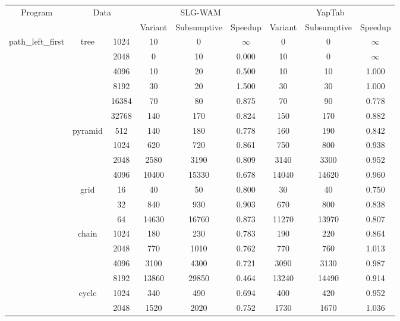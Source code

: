 \begin{table}[ht]
\scriptsize{
\begin{tabular}{c|c|c|c|c|c|c|c|c}
   \hline
   \multirow{2}{*}{Program} & \multicolumn{2}{c|}{\multirow{2}{*}{Data}} & \multicolumn{3}{c|}{SLG-WAM} & \multicolumn{3}{c}{YapTab} \\ \cline{4-6} \cline{7-9}
   & \multicolumn{2}{c|}{} & Variant & Subsumptive & Speedup & Variant & Subsumptive & Speedup \\ \hline
   
   \multirow{20}{*}{path\_left\_first} &  \multirow{6}{*}{tree} &  1024 &  10 & 0 &  $\infty$  & 0 & 0 &  $\infty$ \\
   &  &  2048 &  0 & 10 &  0.000  & 10 & 0 &  $\infty$ \\
   &  &  4096 &  10 & 20 &  0.500  & 10 & 10 &  1.000 \\
   &  &  8192 &  30 & 20 &  1.500  & 30 & 30 &  1.000 \\
   &  &  16384 &  70 & 80 &  0.875  & 70 & 90 &  0.778 \\
   &  &  32768 &  140 & 170 &  0.824  & 150 & 170 &  0.882 \\
   \cline{2-9}
   &  \multirow{4}{*}{pyramid} &  512 &  140 & 180 &  0.778  & 160 & 190 &  0.842 \\
   &  &  1024 &  620 & 720 &  0.861  & 750 & 800 &  0.938 \\
   &  &  2048 &  2580 & 3190 &  0.809  & 3140 & 3300 &  0.952 \\
   &  &  4096 &  10400 & 15330 &  0.678  & 14040 & 14620 &  0.960 \\
   \cline{2-9}
   &  \multirow{3}{*}{grid} &  16 &  40 & 50 &  0.800  & 30 & 40 &  0.750 \\
   &  &  32 &  840 & 930 &  0.903  & 670 & 800 &  0.838 \\
   &  &  64 &  14630 & 16760 &  0.873  & 11270 & 13970 &  0.807 \\
   \cline{2-9}
   &  \multirow{4}{*}{chain} &  1024 &  180 & 230 &  0.783  & 190 & 220 &  0.864 \\
   &  &  2048 &  770 & 1010 &  0.762  & 770 & 760 &  1.013 \\
   &  &  4096 &  3100 & 4300 &  0.721  & 3090 & 3130 &  0.987 \\
   &  &  8192 &  13860 & 29850 &  0.464  & 13240 & 14490 &  0.914 \\
   \cline{2-9}
   &  \multirow{3}{*}{cycle} &  1024 &  340 & 490 &  0.694  & 400 & 420 &  0.952 \\
   &  &  2048 &  1520 & 2020 &  0.752  & 1730 & 1670 &  1.036 \\

\end{tabular}}
\end{table}
